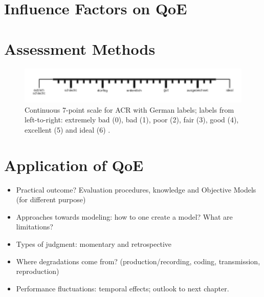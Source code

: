 \section{Influence Factors on \ac{QoE}} %

\section{Assessment Methods}


\begin{figure}
	\includegraphics[width=1\textwidth]{fig/quality7pt_scale}
	\caption{Continuous 7-point scale for \ac{ACR} with German labels; labels from left-to-right: extremely bad (0), bad (1), poor (2), fair (3), good (4), excellent (5) and ideal (6) \citep{itu-t_p.805:_2007}.}
	\label{img:chap02:quality-scale}
\end{figure}


\item \cite{pitrey_aligning_2011}

\section{Application of \acf{QoE}}
\begin{itemize}
\item Practical outcome? Evaluation procedures, knowledge and Objective Models (for different purpose)
\item Approaches towards modeling: how to one create a model? What are limitations?
\item Types of judgment: momentary and retrospective
\item Where degradations come from? (production/recording, coding, transmission, reproduction)
\item Performance fluctuations: temporal effects; outlook to next chapter.
\end{itemize}

